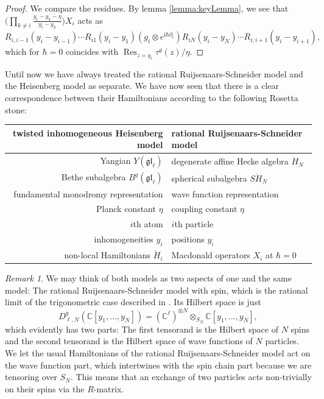 \documentclass[11pt]{report}
\theoremstyle{definition}
\theoremstyle{remark}
\newtheorem*{remark}{Remark}
\theoremstyle{remark}
\newcommand{\C}{\mathbb{C}}
\newcommand{\I}{\mathrm{i}}
\begin{document}
\begin{proof}
We compare the residues. By lemma \ref{lemma:keyLemma}, we see that $\Big( \prod_{k \neq i} \frac{y_i-y_k-\eta}{y_i-y_k} \Big) X_i$ acts as
\begin{equation*}
R_{i,i-1}(y_i-y_{i-1}) \cdots R_{i1}(y_i-y_1) (g_i \otimes e^{\I \hbar \partial_i}) R_{iN}(y_i-y_N) \cdots R_{i,i+1}(y_i-y_{i+1}),
\end{equation*}
which for $\hbar = 0$ coincides with $\operatorname{Res}_{z=y_i} \tau^g(z)/\eta$.
\end{proof}

Until now we have always treated the rational Ruijsenaars-Schneider model and the Heisenberg model as separate. We have now seen that there is a clear correspondence between their Hamiltonians according to the following Rosetta stone:
\begin{center}
\begin{tabular}{|r||l|}
\hline
twisted inhomogeneous Heisenberg model & rational Ruijsenaars-Schneider model \\
\hline
Yangian $Y(\mathfrak{gl}_\ell)$ & degenerate affine Hecke algebra $\dot H_N$ \\
Bethe subalgebra $B^g(\mathfrak{gl}_\ell)$ & spherical subalgebra $S\ddot H_N$ \\
fundamental monodromy representation & wave function representation \\
Planck constant $\eta$ & coupling constant $\eta$ \\
$i$th atom & $i$th particle \\
inhomogeneities $y_i$ & positions $y_i$ \\
non-local Hamiltonians $\check H_i$ & Macdonald operators $X_i$ at $\hbar = 0$ \\
\hline
\end{tabular}
\end{center}

\begin{remark}
We may think of both models as two aspects of one and the same model: The rational Ruijsenaars-Schneider model with spin, which is the rational limit of the trigonometric case described in \cite{article:lamers:2022}. Its Hilbert space is just
\begin{equation*}
D_{\ell,N}^g(\C[y_1,...,y_N]) = (\C^\ell)^{\otimes N} \otimes_{S_N} \C[y_1,...,y_N],
\end{equation*}
which evidently has two parts: The first tensorand is the Hilbert space of $N$ spins and the second tensorand is the Hilbert space of wave functions of $N$ particles. We let the usual Hamiltonians of the rational Ruijsenaars-Schneider model act on the wave function part, which intertwines with the spin chain part because we are tensoring over $S_N$. This means that an exchange of two particles acts non-trivially on their spins via the $R$-matrix.
\end{remark}
\end{document}
